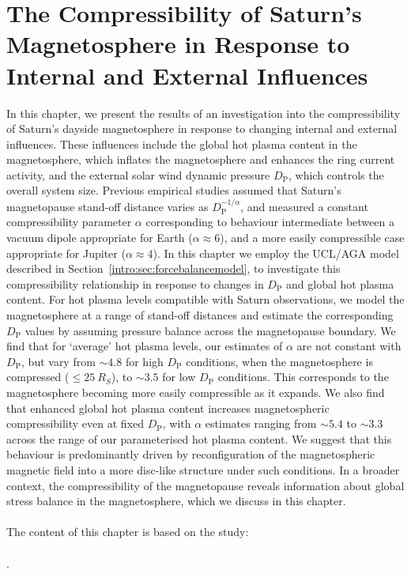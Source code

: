 \chapter[The Compressibility of Saturn's Magnetosphere]{The Compressibility of Saturn's Magnetosphere in Response to Internal and External Influences}
\label{chap:compress}

In this chapter, we present the results of an investigation into the compressibility of Saturn's dayside magnetosphere in response to changing internal and external influences. These influences include the global hot plasma content in the magnetosphere, which inflates the magnetosphere and enhances the ring current activity, and the external solar wind dynamic pressure $D_\mathrm{P}$, which controls the overall system size. Previous empirical studies assumed that Saturn's magnetopause stand-off distance varies as $D_\mathrm{P}^{-1/\alpha}$, and measured a constant compressibility parameter $\alpha$ corresponding to behaviour intermediate between a vacuum dipole appropriate for Earth ($\alpha \approx 6$), and a more easily compressible case appropriate for Jupiter ($\alpha \approx 4$). In this chapter we employ the UCL/AGA model described in Section~\ref{intro:sec:forcebalancemodel}, to investigate this compressibility relationship in response to changes in $D_\mathrm{P}$ and global hot plasma content. For hot plasma levels compatible with Saturn observations, we model the magnetosphere at a range of stand-off distances and estimate the corresponding $D_\mathrm{P}$ values by assuming pressure balance across the magnetopause boundary. We find that for `average' hot plasma levels, our estimates of $\alpha$ are not constant with $D_\mathrm{P}$, but vary from ${\sim}4.8$ for high $D_\mathrm{P}$ conditions, when the magnetosphere is compressed (${\leq}\SI{25}{R_S}$), to ${\sim}3.5$ for low $D_\mathrm{P}$ conditions. This corresponds to the magnetosphere becoming more easily compressible as it expands. We also find that enhanced global hot plasma content increases magnetospheric compressibility even at fixed $D_\mathrm{P}$, with $\alpha$ estimates ranging from ${\sim}5.4$ to ${\sim}3.3$ across the range of our parameterised hot plasma content. We suggest that this behaviour is predominantly driven by reconfiguration of the magnetospheric magnetic field into a more disc-like structure under such conditions. In a broader context, the compressibility of the magnetopause reveals information about global stress balance in the magnetosphere, which we discuss in this chapter. \\
\\
The content of this chapter is based on the study:\\
\\
.

